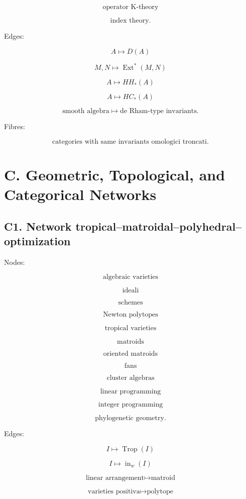 \documentclass[11pt]{article}
\begin{document}
\[
\text{operator K-theory}
\]

\[
\text{index theory}.
\]

Edges:

\[
A\mapsto D(A)
\]

\[
M,N\mapsto \operatorname{Ext}^\ast(M,N)
\]

\[
A\mapsto HH_\ast(A)
\]

\[
A\mapsto HC_\ast(A)
\]

\[
\text{smooth algebra}\mapsto \text{de Rham-type invariants}.
\]

Fibres:

\[
\text{categories with same invariants omologici troncati}.
\]



\section{C. Geometric, Topological, and Categorical Networks}



\subsection{C1. Network tropical--matroidal--polyhedral--optimization}

Nodes:

\[
\text{algebraic varieties}
\]

\[
\text{ideali}
\]

\[
\text{schemes}
\]

\[
\text{Newton polytopes}
\]

\[
\text{tropical varieties}
\]

\[
\text{matroids}
\]

\[
\text{oriented matroids}
\]

\[
\text{fans}
\]

\[
\text{cluster algebras}
\]

\[
\text{linear programming}
\]

\[
\text{integer programming}
\]

\[
\text{phylogenetic geometry}.
\]

Edges:

\[
I\mapsto \operatorname{Trop}(I)
\]

\[
I\mapsto \operatorname{in}_w(I)
\]

\[
\text{linear arrangement}\mapsto \text{matroid}
\]

\[
\text{varieties positiva}\mapsto \text{polytope}
\]
\end{document}

